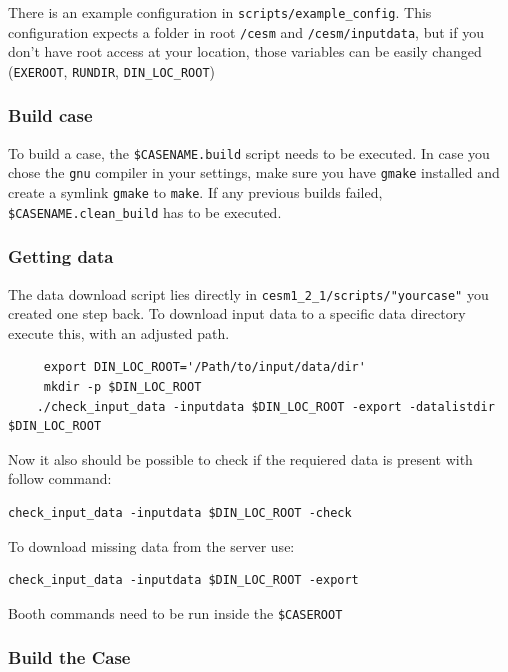 \documentclass[]{article}
\begin{document}
There is an example configuration in \texttt{scripts/example\_config}.
This configuration expects a folder in root \texttt{/cesm} and
\texttt{/cesm/inputdata}, but if you don't have root access at your
location, those variables can be easily changed (\texttt{EXEROOT},
\texttt{RUNDIR}, \texttt{DIN\_LOC\_ROOT})

\subsubsection{Build case}\label{build-case}

To build a case, the \texttt{\$CASENAME.build} script needs to be
executed. In case you chose the \texttt{gnu} compiler in your settings,
make sure you have \texttt{gmake} installed and create a symlink
\texttt{gmake} to \texttt{make}. If any previous builds failed,
\texttt{\$CASENAME.clean\_build} has to be executed.

\subsubsection{Getting data}\label{getting-data}

The data download script lies directly in
\texttt{cesm1\_2\_1/scripts/"yourcase"} you created one step back. To
download input data to a specific data directory execute this, with an
adjusted path.

\begin{verbatim}
     export DIN_LOC_ROOT='/Path/to/input/data/dir'
     mkdir -p $DIN_LOC_ROOT
    ./check_input_data -inputdata $DIN_LOC_ROOT -export -datalistdir $DIN_LOC_ROOT  
\end{verbatim}

Now it also should be possible to check if the requiered data is present
with follow command:

\begin{verbatim}
check_input_data -inputdata $DIN_LOC_ROOT -check
\end{verbatim}

To download missing data from the server use:

\begin{verbatim}
check_input_data -inputdata $DIN_LOC_ROOT -export
\end{verbatim}

Booth commands need to be run inside the \texttt{\$CASEROOT}

\subsubsection{Build the Case}\label{build-the-case}
\end{document}
